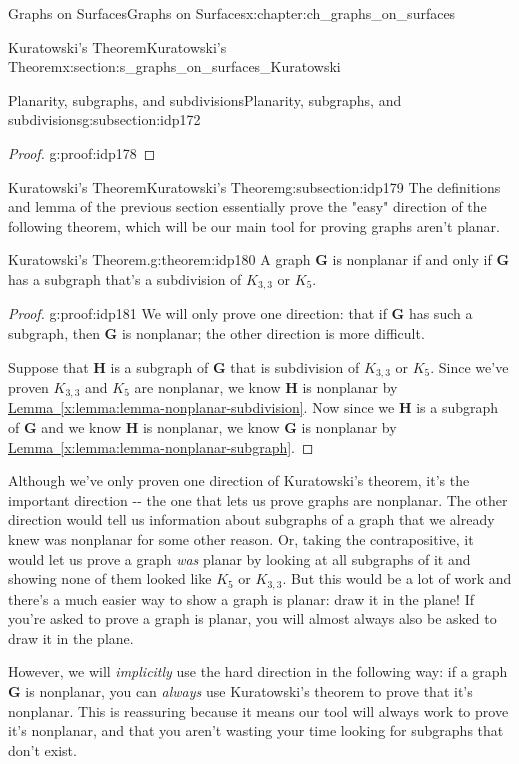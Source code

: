 \documentclass[oneside,10pt,]{book}
\newcommand{\xreffont}{\relax}
\numberwithin{equation}{section}
\newcommand{\bfG}{\mathbf{G}}
\newcommand{\bfH}{\mathbf{H}}
\begin{document}
\begin{chapterptx}{Graphs on Surfaces}{}{Graphs on Surfaces}{}{}{x:chapter:ch_graphs_on_surfaces}
\begin{sectionptx}{Kuratowski's Theorem}{}{Kuratowski's Theorem}{}{}{x:section:s_graphs_on_surfaces_Kuratowski}
\begin{subsectionptx}{Planarity, subgraphs, and subdivisions}{}{Planarity, subgraphs, and subdivisions}{}{}{g:subsection:idp172}
\begin{proof}{}{g:proof:idp178}
\end{proof}
\end{subsectionptx}
%
%
\typeout{************************************************}
\typeout{************************************************}
%
\begin{subsectionptx}{Kuratowski's Theorem}{}{Kuratowski's Theorem}{}{}{g:subsection:idp179}
The definitions and lemma of the previous section essentially prove the "easy" direction of the following theorem, which will be our main tool for proving graphs aren't planar.%
\begin{theorem}{Kuratowski's Theorem.}{}{g:theorem:idp180}%
A graph \(\bfG\) is nonplanar if and only if \(\bfG\) has a subgraph that's a subdivision of \(K_{3,3}\) or \(K_5\).%
\end{theorem}
\begin{proof}{}{g:proof:idp181}
We will only prove one direction: that if \(\bfG\) has such a subgraph, then \(\bfG\) is nonplanar; the other direction is more difficult.%
\par
Suppose that \(\bfH\) is a subgraph of \(\bfG\) that is subdivision of \(K_{3,3}\) or \(K_5\).  Since we've proven \(K_{3,3}\) and \(K_5\) are nonplanar, we know \(\bfH\) is nonplanar by \hyperref[x:lemma:lemma-nonplanar-subdivision]{Lemma~{\xreffont\ref{x:lemma:lemma-nonplanar-subdivision}}}.  Now since we \(\bfH\) is a subgraph of \(\bfG\) and we know \(\bfH\) is nonplanar, we know \(\bfG\) is nonplanar by \hyperref[x:lemma:lemma-nonplanar-subgraph]{Lemma~{\xreffont\ref{x:lemma:lemma-nonplanar-subgraph}}}.%
\end{proof}
Although we've only proven one direction of Kuratowski's theorem, it's the important direction -{}-{} the one that lets us prove graphs are nonplanar.  The other direction would tell us information about subgraphs of a graph that we already knew was nonplanar for some other reason.  Or, taking the contrapositive, it would let us prove a graph \emph{was} planar by looking at all subgraphs of it and showing none of them looked like \(K_5\) or \(K_{3,3}\).  But this would be a lot of work and there's a much easier way to show a graph is planar: draw it in the plane! If you're asked to prove a graph is planar, you will almost always also be asked to draw it in the plane.%
\par
However, we will \emph{implicitly} use the hard direction in the following way: if a graph \(\bfG\) is nonplanar, you can \emph{always} use Kuratowski's theorem to prove that it's nonplanar.  This is reassuring because it means our tool will always work to prove it's nonplanar, and that you aren't wasting your time looking for subgraphs that don't exist.%

\end{subsectionptx}
\end{sectionptx}
\end{chapterptx}
\end{document}
